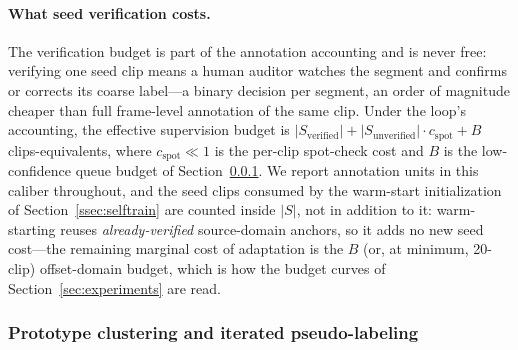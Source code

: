 \paragraph{What seed verification costs.}
The verification budget is part of the annotation accounting and is never free: verifying one seed clip means a human auditor watches the segment and confirms or corrects its coarse label---a binary decision per segment, an order of magnitude cheaper than full frame-level annotation of the same clip. Under the loop's accounting, the effective supervision budget is $|S_{\mathrm{verified}}| + |S_{\mathrm{unverified}}| \cdot c_{\mathrm{spot}} + B$ clips-equivalents, where $c_{\mathrm{spot}} \ll 1$ is the per-clip spot-check cost and $B$ is the low-confidence queue budget of Section~\ref{ssec:proto}. We report annotation units in this caliber throughout, and the seed clips consumed by the warm-start initialization of Section~\ref{ssec:selftrain} are counted inside $|S|$, not in addition to it: warm-starting reuses \emph{already-verified} source-domain anchors, so it adds no new seed cost---the remaining marginal cost of adaptation is the $B$ (or, at minimum, 20-clip) offset-domain budget, which is how the budget curves of Section~\ref{sec:experiments} are read.

\subsubsection{Prototype clustering and iterated pseudo-labeling}\label{ssec:proto}

